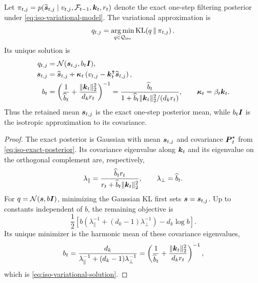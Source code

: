 \documentclass{article} %
\begin{document}
\begin{proposition}
\label{prop:iso-variational-inference}
Let
$\pi_{t,j}=p(\widetilde{\boldsymbol{s}}_{t,j}\mid
v_{t,j},\mathcal{F}_{t-1},\boldsymbol{k}_t,r_t)$ denote the exact one-step filtering posterior under
\eqref{eq:iso-variational-model}. The variational approximation is
\begin{equation}
  q_{t,j}
  =\operatorname*{arg\,min}_{q\in\mathcal{Q}_{\mathrm{iso}}}
    \operatorname{KL}\!\left(q\,\|\,\pi_{t,j}\right).
  \label{eq:iso-variational-objective}
\end{equation}
Its unique solution is
\begin{equation}
\begin{aligned}
  q_{t,j}
  &=\mathcal N(\boldsymbol{s}_{t,j},b_t\boldsymbol{I}),
  \\
  \boldsymbol{s}_{t,j}
  &=\widehat{\boldsymbol{s}}_{t,j}
    +\boldsymbol{\kappa}_t
      \left(v_{t,j}-\boldsymbol{k}_t^{\intercal}\widehat{\boldsymbol{s}}_{t,j}\right),
  \\
  b_t
  &=\left(
      \frac{1}{\widehat b_t}
      +\frac{\|\boldsymbol{k}_t\|_2^2}{d_k r_t}
    \right)^{-1}
   =\frac{\widehat b_t}
    {1+\widehat b_t\|\boldsymbol{k}_t\|_2^2/(d_k r_t)},
  \qquad
  \boldsymbol{\kappa}_t=\beta_t\boldsymbol{k}_t.
\end{aligned}
  \label{eq:iso-variational-solution}
\end{equation}
Thus the retained mean $\boldsymbol{s}_{t,j}$ is the exact one-step posterior mean, while $b_t\boldsymbol{I}$ is
the isotropic approximation to its covariance.
\end{proposition}

\begin{proof}
The exact posterior is Gaussian with mean $\boldsymbol{s}_{t,j}$ and covariance $\boldsymbol{P}_t^\star$ from
\eqref{eq:iso-exact-posterior}. Its covariance eigenvalue along $\boldsymbol{k}_t$ and its eigenvalue on
the orthogonal complement are, respectively,
\begin{equation}
  \lambda_{\parallel}
  =\frac{\widehat b_t r_t}
    {r_t+\widehat b_t\|\boldsymbol{k}_t\|_2^2},
  \qquad
  \lambda_{\perp}=\widehat b_t.
  \label{eq:iso-posterior-eigenvalues}
\end{equation}
For $q=\mathcal N(\boldsymbol{s},b\boldsymbol{I})$, minimizing the Gaussian KL first sets
$\boldsymbol{s}=\boldsymbol{s}_{t,j}$. Up to constants independent of $b$, the remaining objective is
\begin{equation}
  \frac{1}{2}
  \left[
    b\left(\lambda_{\parallel}^{-1}
      +(d_k-1)\lambda_{\perp}^{-1}\right)
    -d_k\log b
  \right].
  \label{eq:iso-variational-covariance-objective}
\end{equation}
Its unique minimizer is the harmonic mean of these covariance eigenvalues,
\begin{equation}
  b_t
  =\frac{d_k}
    {\lambda_{\parallel}^{-1}+(d_k-1)\lambda_{\perp}^{-1}}
  =\left(
      \frac{1}{\widehat b_t}
      +\frac{\|\boldsymbol{k}_t\|_2^2}{d_k r_t}
    \right)^{-1},
\end{equation}
which is \eqref{eq:iso-variational-solution}.
\end{proof}
\end{document}
